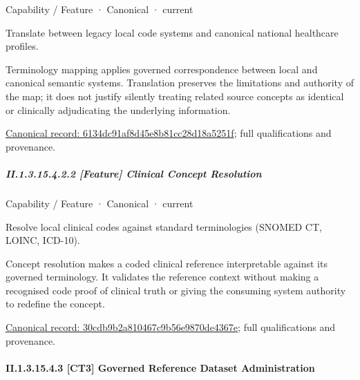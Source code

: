 \label{element:6134dc91af8d45e8b81cc28d18a5251f}
{\small Capability / Feature · Canonical · current}\par

Translate between legacy local code systems and canonical national healthcare profiles.



Terminology mapping applies governed correspondence between local and canonical semantic systems. Translation preserves the limitations and authority of the map; it does not justify silently treating related source concepts as identical or clinically adjudicating the underlying information.


{\footnotesize \href{../../../../continuum/strategy/capability/feature/6134dc91af8d45e8b81cc28d18a5251f.md}{Canonical record: 6134dc91af8d45e8b81cc28d18a5251f}; full qualifications and provenance.}\par
\subparagraph*{II.1.3.15.4.2.2 [Feature] Clinical Concept Resolution}
\label{navigation:II.1.3.15.4.2.2}

\label{element:30cdb9b2a810467c9b56e9870de4367e}
{\small Capability / Feature · Canonical · current}\par

Resolve local clinical codes against standard terminologies (SNOMED CT, LOINC, ICD-10).



Concept resolution makes a coded clinical reference interpretable against its governed terminology. It validates the reference context without making a recognised code proof of clinical truth or giving the consuming system authority to redefine the concept.


{\footnotesize \href{../../../../continuum/strategy/capability/feature/30cdb9b2a810467c9b56e9870de4367e.md}{Canonical record: 30cdb9b2a810467c9b56e9870de4367e}; full qualifications and provenance.}\par
\paragraph*{II.1.3.15.4.3 [CT3] Governed Reference Dataset Administration}
\label{navigation:II.1.3.15.4.3}

